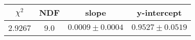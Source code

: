 \begin{tabular}{|c|c|c|c|}

\hline
$\chi^{2}$ & NDF & slope & y-intercept  \\
\hline
2.9267 & 9.0 & $0.0009\pm0.0004$ & $0.9527\pm0.0519$ \\
\hline

\end{tabular}